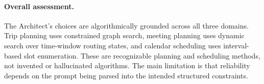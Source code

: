 \paragraph{Overall assessment.}
The Architect's choices are algorithmically grounded across all three
domains.  Trip planning uses constrained graph search, meeting planning uses
dynamic search over time-window routing states, and calendar scheduling uses
interval-based slot enumeration.  These are recognizable planning and
scheduling methods, not invented or hallucinated algorithms.  The main
limitation is that reliability depends on the prompt being parsed into the
intended structured constraints.
